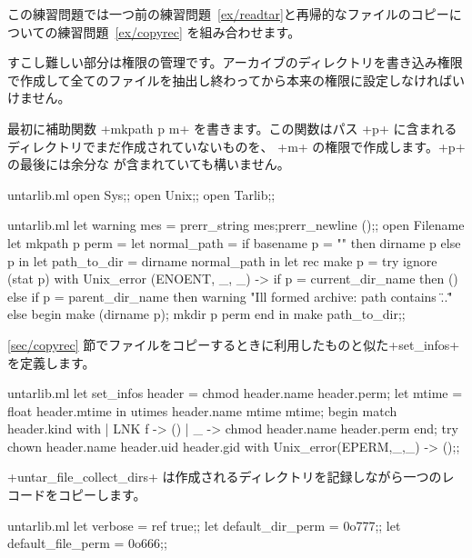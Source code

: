 \begin{answer}
この練習問題では一つ前の練習問題~\ref {ex/readtar}と再帰的なファイルのコピーについての練習問題~\ref {ex/copyrec} を組み合わせます。


すこし難しい部分は権限の管理です。アーカイブのディレクトリを書き込み権限で作成して全てのファイルを抽出し終わってから本来の権限に設定しなければいけません。

最初に補助関数 \ml+mkpath p m+ を書きます。この関数はパス \ml+p+ に含まれるディレクトリでまだ作成されていないものを、 \ml+m+ の権限で作成します。\ml+p+ の最後には余分な \quotes{\ml+/+} が含まれていても構いません。
%
\begin{codefile}{untarlib.ml}
open Sys;;
open Unix;;
open Tarlib;;
\end{codefile}
%
\begin{listingcodefile}{untarlib.ml}
let warning mes = prerr_string mes;prerr_newline ();;
open Filename
let mkpath p perm =
  let normal_path =
    if basename p = "" then dirname p else p in
  let path_to_dir = dirname normal_path in
  let rec make p =
    try ignore (stat p)
    with Unix_error (ENOENT, _, _) ->
      if p = current_dir_name then ()
      else if p = parent_dir_name then
        warning "Ill formed archive: path contains \"..\""
      else begin
        make (dirname p);
        mkdir p perm
      end in
  make path_to_dir;;
\end{listingcodefile}
%
\ref {sec/copyrec} 節でファイルをコピーするときに利用したものと似た\ml+set_infos+ を定義します。
%
\begin{listingcodefile}{untarlib.ml}
let set_infos header =
  chmod header.name header.perm;
  let mtime = float header.mtime in
  utimes header.name mtime mtime;
  begin match header.kind with
  | LNK f -> ()
  | _ ->  chmod header.name header.perm
  end;
  try chown header.name  header.uid header.gid
  with Unix_error(EPERM,_,_) -> ();;
\end{listingcodefile}
%
\ml+untar_file_collect_dirs+ は作成されるディレクトリを記録しながら一つのレコードをコピーします。
%
\begin{listingcodefile}{untarlib.ml}
let verbose = ref true;;
let default_dir_perm = 0o777;;
let default_file_perm = 0o666;;


\end{listingcodefile}
\end{answer}
